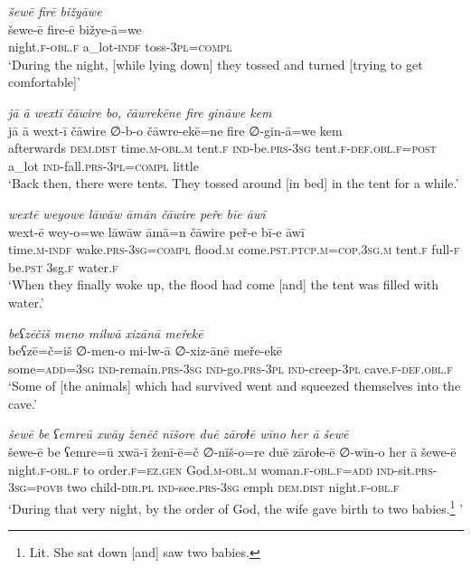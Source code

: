 \ea \label{ZB.18}
\textit{šewē firē bižyāwe} \\ 
\gll šewe-ē fire-ē bižye-ā=we \\ 
 night\textsc{.f}\textsc{-obl}\textsc{.f} a\_lot\textsc{-indf} toss\textsc{-3pl}\textsc{=compl} \\ 
\glt `During the night, [while lying down] they tossed and turned [trying to get comfortable]'
\z 
 
\ea \label{ZB.19}
\textit{jā ā wextī čāwire bo, čāwrekēne fire gināwe kem} \\ 
\gll jā ā wext-ī čāwire ∅-b-o čāwre-ekē=ne fire ∅-gin-ā=we kem \\ 
 afterwards \textsc{dem.dist} time\textsc{.m}\textsc{-obl}\textsc{.m} tent\textsc{.f} \textsc{ind-}be\textsc{.prs}\textsc{-3sg} tent\textsc{.f}\textsc{-def}\textsc{.obl}\textsc{.f}\textsc{=\textsc{post}} a\_lot \textsc{ind-}fall\textsc{.prs}\textsc{-3pl}\textsc{=compl} little \\ 
\glt `Back then, there were tents. They tossed around [in bed] in the tent for a while.'
\z 
 
\ea \label{ZB.20}
\textit{wextē weyowe lāwāw āmān čāwire peře bīe āwī} \\ 
\gll wext-ē wey-o=we lāwāw āmā=n čāwire peř-e bī-e āwī \\ 
 time\textsc{.m}\textsc{-indf} wake\textsc{.prs}\textsc{-3sg}\textsc{=compl} flood\textsc{.m} come\textsc{.pst}\textsc{.ptcp}\textsc{.m}\textsc{=cop}\textsc{.3sg}\textsc{.m} tent\textsc{.f} full\textsc{-f} be\textsc{.pst} 3sg\textsc{.f} water\textsc{.f} \\ 
\glt `When they finally woke up, the flood had come [and] the tent was filled with water.'
\z 
 
\ea \label{ZB.23}
\textit{beʕzēčiš meno milwā xizānā meřekē} \\ 
\gll beʕzē=č=iš ∅-men-o mi-lw-ā ∅-xiz-ānē meře-ekē \\ 
 some\textsc{=add}\textsc{=3sg} \textsc{ind-}remain\textsc{.prs}\textsc{-3sg} \textsc{ind-}go\textsc{.prs}\textsc{-3pl} \textsc{ind-}creep\textsc{-3pl} cave\textsc{.f}\textsc{-def}\textsc{.obl}\textsc{.f} \\ 
\glt `Some of [the animals] which had survived went and squeezed themselves into the cave.'
\z 
 
\ea \label{ZB.24}
\textit{šewē be ʕemreū xwāy ženēč nīšore duē zāroɫē wīno her ā šewē} \\ 
\gll šewe-ē be ʕemre=ū xwā-ī ženī-ē=č ∅-nīš-o=re duē zāroɫe-ē ∅-wīn-o her ā šewe-ē \\ 
 night\textsc{.f}\textsc{-obl}\textsc{.f} to order\textsc{.f}\textsc{\textsc{=ez.gen}} God\textsc{.m}\textsc{-obl}\textsc{.m} woman\textsc{.f}\textsc{-obl}\textsc{.f}\textsc{=add} \textsc{ind-}sit\textsc{.prs}\textsc{-3sg}\textsc{=\textsc{povb}} two child\textsc{-dir}\textsc{.pl} \textsc{ind-}see\textsc{.prs}\textsc{-3sg} emph \textsc{dem.dist} night\textsc{.f}\textsc{-obl}\textsc{.f} \\ 
\glt `During that very night, by the order of God, the wife gave birth to two babies.\footnote{Lit. She sat down [and] saw two babies.} '
\z 
 
